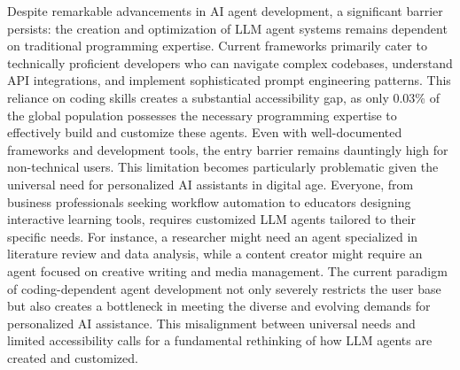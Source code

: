 Despite remarkable advancements in AI agent development, a significant barrier persists: the creation and optimization of LLM agent systems remains dependent on traditional programming expertise. Current frameworks primarily cater to technically proficient developers who can navigate complex codebases, understand API integrations, and implement sophisticated prompt engineering patterns. This reliance on coding skills creates a substantial accessibility gap, as only 0.03\% of the global population possesses the necessary programming expertise to effectively build and customize these agents. Even with well-documented frameworks and development tools, the entry barrier remains dauntingly high for non-technical users. This limitation becomes particularly problematic given the universal need for personalized AI assistants in digital age. Everyone, from business professionals seeking workflow automation to educators designing interactive learning tools, requires customized LLM agents tailored to their specific needs. For instance, a researcher might need an agent specialized in literature review and data analysis, while a content creator might require an agent focused on creative writing and media management. The current paradigm of coding-dependent agent development not only severely restricts the user base but also creates a bottleneck in meeting the diverse and evolving demands for personalized AI assistance. This misalignment between universal needs and limited accessibility calls for a fundamental rethinking of how LLM agents are created and customized.


